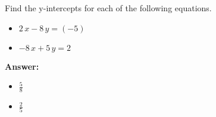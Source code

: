  Find the y-intercepts for each of the following equations. \begin{itemize}\item \( 2 \, x - 8 \, y = \left(-5\right) \)\item \( -8 \, x + 5 \, y = 2 \)\end{itemize}

        \textbf{Answer:} \begin{itemize}\item \( \frac{5}{8} \)\item \( \frac{2}{5} \)\end{itemize}
